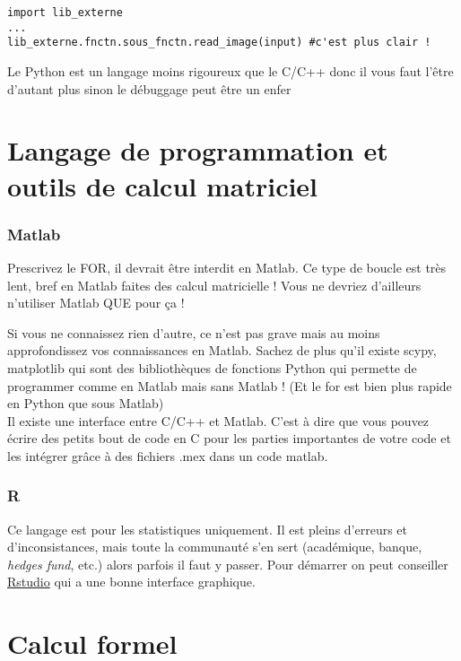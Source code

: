 \begin{lstlisting}[style=pythonsty]
import lib_externe
...
lib_externe.fnctn.sous_fnctn.read_image(input) #c'est plus clair !
\end{lstlisting}
Le Python est un langage moins rigoureux que le C/C++ donc il vous faut l'être d'autant plus
 sinon le débuggage peut être un enfer 




\section{Langage de programmation et outils de calcul matriciel}



\subsubsection*{Matlab}

Prescrivez le FOR, il devrait être interdit en Matlab. Ce type de boucle est très lent, bref en Matlab 
faites des calcul matricielle ! Vous ne devriez d'ailleurs n'utiliser Matlab QUE pour ça !

Si vous ne connaissez rien d'autre, ce n'est pas grave mais au moins approfondissez vos connaissances 
en Matlab.  Sachez de plus qu'il existe scypy, matplotlib  qui sont des bibliothèques de fonctions Python 
qui permette de programmer comme en Matlab mais sans Matlab ! (Et le for est bien plus rapide 
en Python que sous Matlab)\\

Il existe une interface entre C/C++ et Matlab. C'est à dire que vous pouvez écrire des petits bout de code en C
pour les parties importantes de votre code et les intégrer grâce à des fichiers .mex dans un code matlab.


\subsubsection*{R} Ce langage est pour les statistiques uniquement. 
Il est pleins d'erreurs et d'inconsistances, mais
toute la communauté s'en sert (académique, banque, \textit{hedges fund}, etc.) alors parfois 
il faut y passer. 
Pour démarrer on peut conseiller \href{http://www.rstudio.com/}{Rstudio} qui a une bonne interface graphique.

\section{Calcul formel}


